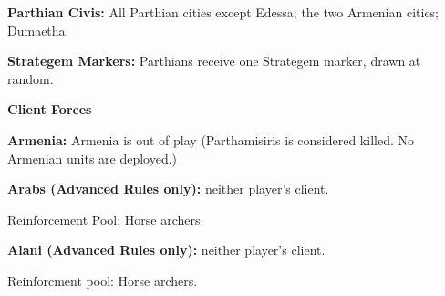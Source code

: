 \textbf{Parthian Civis:} All Parthian cities except Edessa; the two Armenian cities; Dumaetha.

\textbf{Strategem Markers:} Parthians receive one Strategem marker, drawn at random.

\textbf{Client Forces}

\textbf{Armenia:} Armenia is out of play (Parthamisiris is considered killed. No Armenian units are deployed.)

\textbf{Arabs (Advanced Rules only):} neither player's client.

Reinforcement Pool: Horse archers.

\textbf{Alani (Advanced Rules only):} neither player's client.

Reinforcment pool: Horse archers.